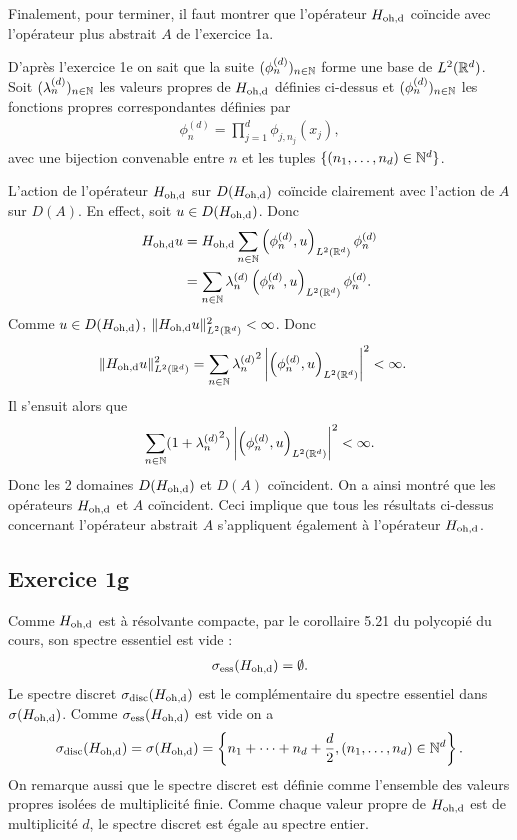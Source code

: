 Finalement, pour terminer, il faut montrer que l'opérateur $H_\text{oh,d}$
coïncide avec l'opérateur plus abstrait $A$ de l'exercice 1a.

D'après l'exercice 1e on sait que la suite $({\phi}_n^{(d)})_{n \in \mathbb{N}}$ forme
une base de $L^2(\mathbb{R}^d)$. Soit $({\lambda}_n^{(d)})_{n \in \mathbb{N}}$ les valeurs propres de
$H_\text{oh,d}$ définies ci-dessus et $({\phi}_n^{(d)})_{n \in \mathbb{N}}$
les fonctions propres correspondantes définies par
\begin{align}
    \phi_n^{(d)} = \prod_{j=1}^d \phi_{j, n_j}(x_j),
\end{align}
avec une bijection convenable entre $n$ et les tuples
$\{(n_1, \dots, n_d) \in \mathbb{N}^d\}$.

L'action de l'opérateur $H_\text{oh,d}$ sur $D(H_\text{oh,d})$ coïncide
clairement avec l'action de $A$ sur $D(A)$.
En effect, soit $u \in D(H_\text{oh,d})$. Donc
\begin{align}
    H_\text{oh,d} u &= H_\text{oh,d} \sum_{{n \in \mathbb{N}}} \left( \phi_n^{(d)}, u \right)_{L^2(\mathbb{R}^d)} \phi_n^{(d)} \\
    &= \sum_{{n \in \mathbb{N}}} \lambda_n^{(d)} \left( \phi_n^{(d)}, u \right)_{L^2(\mathbb{R}^d)} \phi_n^{(d)}.
\end{align}
%
Comme $u \in D(H_\text{oh,d})$, $\| H_\text{oh,d} u \|_{L^2(\mathbb{R}^d)}^2 < \infty$. Donc
\begin{align}
    \normeldd{\hod u}^2
%
    &= \sum_\inn{n} {\lambda_n^{(d)}}^2
    \left| \psl{\phi_n^{(d)}}{u} \right|^2 < \infty.
\end{align}
%
Il s'ensuit alors que
\begin{align}
    \sum_{n \in \mathbb{N}} (1 + {\lambda_n^{(d)}}^2)
    \left| \left( \phi_n^{(d)}, u \right)_{L^2(\mathbb{R}^d)} \right|^2 < \infty.
\end{align}
%
Donc les 2 domaines $D(H_\text{oh,d})$ et $D(A)$ coïncident. On a
ainsi montré que les opérateurs $H_\text{oh,d}$ et $A$
coïncident. Ceci implique que tous les résultats
ci-dessus concernant l'opérateur abstrait $A$ s'appliquent également
à l'opérateur $H_\text{oh,d}$.


\subsection*{Exercice 1g}

Comme $H_\text{oh,d}$ est à résolvante compacte, par le corollaire 5.21
du polycopié du cours, son spectre
essentiel est vide :
\begin{align}
    \sigma_{\text{ess}}(H_\text{oh,d}) = \emptyset.
\end{align}
%
Le spectre discret $\sigma_{\text{disc}}(H_\text{oh,d})$ est le complémentaire
du spectre essentiel dans $\sigma(H_\text{oh,d})$. Comme
$\sigma_{\text{ess}}(H_\text{oh,d})$
est vide on a
\begin{align}
    \sigma_{\text{disc}}(H_\text{oh,d}) = \sigma(H_\text{oh,d})
    = \left\{ n_1 + \cdots + n_d + \frac{d}{2}, (n_1, \dots, n_d)
    \in \mathbb{N}^d \right\}.
\end{align}
%
On remarque aussi que le spectre discret est définie comme
l'ensemble des valeurs propres isolées de multiplicité finie.
Comme chaque valeur propre de $H_\text{oh,d}$ est de multiplicité $d$,
le spectre discret est égale au spectre entier.

